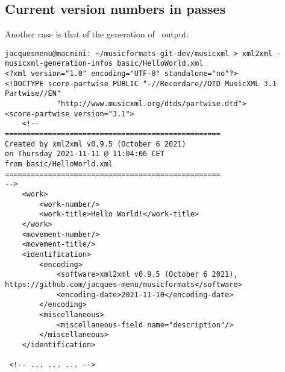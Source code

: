 \subsection{Current version numbers in passes}\label{Current version numbers in passes}

Another case is that of the generation of \mxml\ output:
\begin{lstlisting}[language=Terminal]
jacquesmenu@macmini: ~/musicformats-git-dev/musicxml > xml2xml -musicxml-generation-infos basic/HelloWorld.xml
<?xml version="1.0" encoding="UTF-8" standalone="no"?>
<!DOCTYPE score-partwise PUBLIC "-//Recordare//DTD MusicXML 3.1 Partwise//EN"
			"http://www.musicxml.org/dtds/partwise.dtd">
<score-partwise version="3.1">
    <!--
==================================================
Created by xml2xml v0.9.5 (October 6 2021)
on Thursday 2021-11-11 @ 11:04:06 CET
from basic/HelloWorld.xml
==================================================
-->
    <work>
        <work-number/>
        <work-title>Hello World!</work-title>
    </work>
    <movement-number/>
    <movement-title/>
    <identification>
        <encoding>
            <software>xml2xml v0.9.5 (October 6 2021), https://github.com/jacques-menu/musicformats</software>
            <encoding-date>2021-11-10</encoding-date>
        </encoding>
        <miscellaneous>
            <miscellaneous-field name="description"/>
        </miscellaneous>
    </identification>

 <!-- ... ... ... -->
\end{lstlisting}

